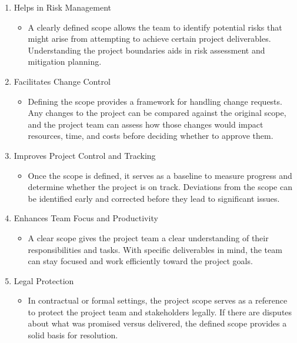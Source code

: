 \documentclass[a4paper]{article}
\begin{document}
\begin{enumerate}
\begin{itemize}
    \end{itemize}
    \item Helps in Risk Management 
    \begin{itemize}
        \item A clearly defined scope allows the team to identify potential risks that might arise from attempting to 
            achieve certain project deliverables. Understanding the project boundaries aids in risk assessment and mitigation planning.
    \end{itemize}
    \item Facilitates Change Control 
    \begin{itemize}
        \item Defining the scope provides a framework for handling change requests. Any changes to the project can be compared against the
            original scope, and the project team can assess how those changes would impact resources, time, and costs before deciding whether 
            to approve them.
    \end{itemize}
    \item Improves Project Control and Tracking
    \begin{itemize}
        \item Once the scope is defined, it serves as a baseline to measure progress and determine whether the project is on track. Deviations from 
            the scope can be identified early and corrected before they lead to significant issues.
    \end{itemize}
    \item Enhances Team Focus and Productivity 
    \begin{itemize}
        \item A clear scope gives the project team a clear understanding of their responsibilities 
            and tasks. With specific deliverables in mind, the team can stay focused and work efficiently toward the project goals.
    \end{itemize}
    \item Legal Protection
    \begin{itemize}
        \item In contractual or formal settings, the project scope serves as a reference to protect the project 
            team and stakeholders legally. If there are disputes about what was promised versus delivered, the defined scope provides a 
            solid basis for resolution.
    \end{itemize}
\end{enumerate}
\end{document}

